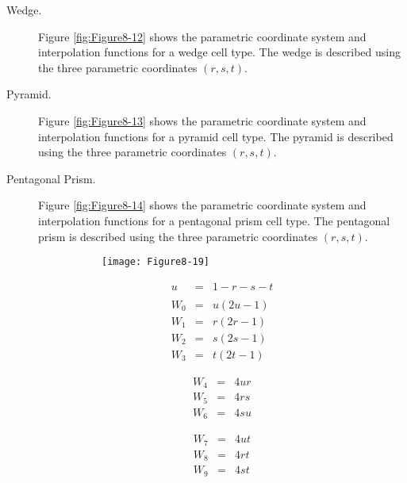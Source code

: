 \begin{description}
    \item[Wedge.] Figure \ref{fig:Figure8-12} shows the parametric coordinate system and interpolation functions for a wedge cell type. The wedge is described using the three parametric coordinates $(r,s,t)$.

    \item[Pyramid.] Figure \ref{fig:Figure8-13} shows the parametric coordinate system and interpolation functions for a pyramid cell type. The pyramid is described using the three parametric coordinates $(r,s,t)$.

    \item[Pentagonal Prism.] Figure \ref{fig:Figure8-14} shows the parametric coordinate system and interpolation functions for a pentagonal prism cell type. The pentagonal prism is described using the three parametric coordinates $(r,s,t)$.

    \begin{figure}[!htb]
        \centering
        \begin{subfigure}{0.48\linewidth}
            \centering
            \texttt{[image: Figure8-19]}
            \caption*{}
        \end{subfigure}
        \hfill
        \begin{subfigure}{0.48\linewidth}
            \centering
            \begin{equation*}
            \begin{array}{lll}
            u &=& 1 - r - s- t \\ \\
            W_0 &=& u(2u-1) \\
            W_1 &=& r(2r - 1) \\
            W_2 &=& s(2s - 1) \\
            W_3 &=& t (2t - 1)
            \end{array}
            \end{equation*}
            \noindent\begin{minipage}{.5\linewidth}
                \begin{equation*}
                \begin{array}{lll}
                W_4 &=& 4 u r \\
                W_5 &=& 4 r s \\
                W_6 &=& 4 s u
                \end{array}
                \end{equation*}
            \end{minipage}%
            \noindent\begin{minipage}{.5\linewidth}
                \begin{equation*}
                \begin{array}{lll}
                W_7 &=& 4 u t \\
                W_8 &=& 4 r t \\
                W_9 &=& 4 s t
                \end{array}
                \end{equation*}
            \end{minipage}%


\end{subfigure}
\end{figure}
\end{description}

